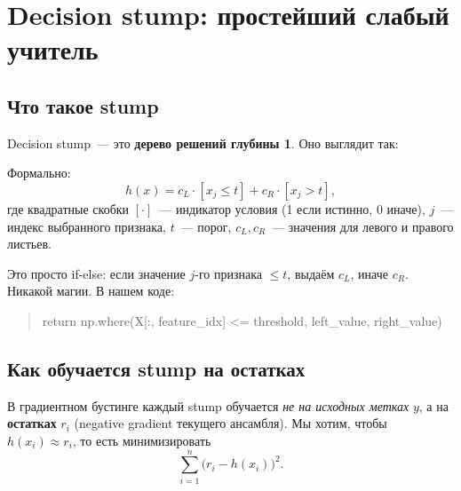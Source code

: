 \documentclass[12pt,a4paper]{article}
\begin{document}
\section{Decision stump: простейший слабый учитель}

\subsection{Что такое stump}

Decision stump~--- это \textbf{дерево решений глубины 1}. Оно выглядит так:

\begin{center}
\end{center}

Формально:
\[
  h(x) = c_L \cdot [x_j \le t] + c_R \cdot [x_j > t],
\]
где квадратные скобки $[\cdot]$~--- индикатор условия (1 если истинно, 0 иначе), $j$~--- индекс выбранного признака, $t$~--- порог, $c_L, c_R$~--- значения для левого и правого листьев.

\begin{intuition}
Это просто if-else: если значение $j$-го признака $\le t$, выдаём $c_L$, иначе $c_R$. Никакой магии. В нашем коде:
\begin{quote}\small\ttfamily
return np.where(X[:, feature\_idx] <= threshold, left\_value, right\_value)
\end{quote}
\end{intuition}

\subsection{Как обучается stump на остатках}

В градиентном бустинге каждый stump обучается \emph{не на исходных метках} $y$, а на \textbf{остатках} $r_i$ (negative gradient текущего ансамбля). Мы хотим, чтобы $h(x_i) \approx r_i$, то есть минимизировать
\[
  \sum_{i=1}^n \bigl(r_i - h(x_i)\bigr)^2.
\]
\end{document}
